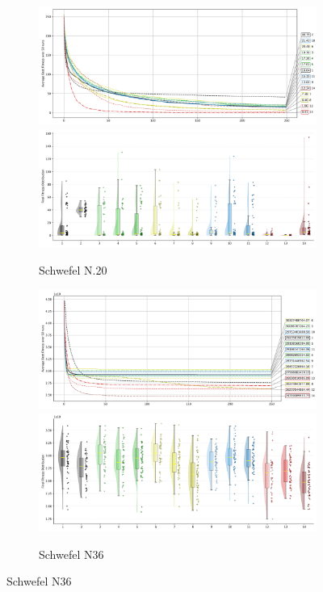 \begin{figure}[p]\ContinuedFloat
\renewcommand\thesubfigure{C.\arabic{figure}.\arabic{subfigure}} %

    \centering

\begin{subfigure}{1\textwidth}
    \centering
    \includegraphics[width=.49\textwidth]{Figures/results/100/Schwefel_N20_All_selected_algorithms_dim100_annot_legend.png}
    \includegraphics[width=.49\textwidth]{Figures/results/100/Schwefel_N20_all_dim100_raincloud_vertical.png}
    \caption{Schwefel N.20}
\end{subfigure}

\begin{subfigure}{1\textwidth}
    \centering
    \includegraphics[width=.49\textwidth]{Figures/results/100/Schwefel_N36_All_selected_algorithms_dim100_annot_legend.png}
    \includegraphics[width=.49\textwidth]{Figures/results/100/Schwefel_N36_all_dim100_raincloud_vertical.png}
    \caption{Schwefel N36}
\end{subfigure}


\end{figure}
